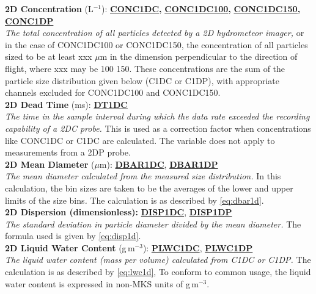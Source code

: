 \begin{hangparagraphs}
\textbf{2D Concentration }(L$^{-1}$):\textbf{ }\textbf{\uline{CONC1DC}}\textbf{,
}\textbf{\uline{CONC1DC100}}\textbf{,
}\textbf{\uline{CONC1DC150,}}\textbf{
}\textbf{\uline{CONC1DP}}\textbf{}\textbf{\uline{}}\\
\emph{The total concentration of all particles
detected by a 2D hydrometeor imager,} or in the case of CONC1DC100
or CONC1DC150, the concentration of all particles sized to be at least
xxx $\mu$m in the dimension perpendicular to the direction of flight,
where xxx may be 100 150. These concentrations are the sum of the
particle size distribution given below (C1DC or C1DP), with appropriate
channels excluded for CONC1DC100 and CONC1DC150.\\

\textbf{2D Dead Time }(ms):\textbf{ }\textbf{\uline{DT1DC}}\\
\emph{The time in the sample interval during which
the data rate exceeded the recording capability of a 2DC probe.} This
is used as a correction factor when concentrations like CONC1DC or
C1DC are calculated. The variable does not apply to measurements from
a 2DP probe.\\

\textbf{2D Mean Diameter }($\mu$m):\textbf{ }\textbf{\uline{DBAR1DC}},
\textbf{\uline{DBAR1DP}}\\
\emph{The mean diameter calculated
from the measured size distribution. }In this calculation, the bin
sizes are taken to be the averages of the lower and upper limits of
the size bins\emph{. }The calculation is as described by \eqref{eq:dbar1d}.\emph{
}\\

\textbf{2D Dispersion (dimensionless): }\textbf{\uline{DISP1DC}},
\textbf{\uline{DISP1DP}}\\
\emph{The standard deviation in particle diameter
divided by the mean diameter.} The formula used is given by \eqref{eq:disp1d}.\\

\textbf{2D Liquid Water Content} (g\,m$^{-3}$):\textbf{ }\textbf{\uline{PLWC1DC}},
\textbf{\uline{PLWC1DP}}\\
\emph{The liquid water content (mass
per volume) calculated from C1DC or C1DP.} The calculation is as described
by \eqref{eq:lwc1d}, To conform to common usage, the liquid water
content is expressed in non-MKS units of g\,m$^{-3}$. \\


\end{hangparagraphs}
